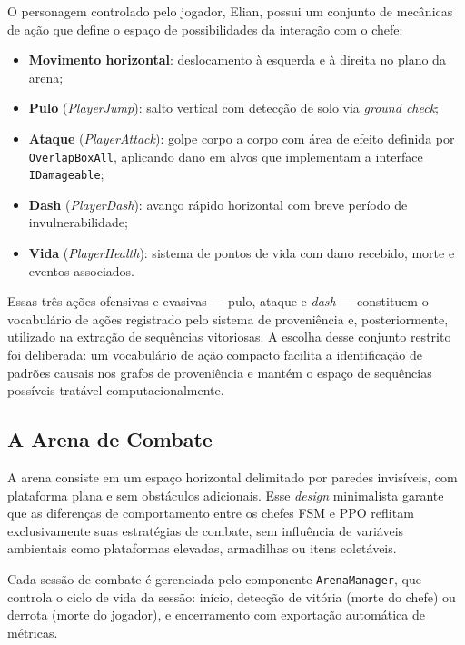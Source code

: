 O personagem controlado pelo jogador, Elian, possui um conjunto de mecânicas
de ação que define o espaço de possibilidades da interação com o chefe:

\begin{itemize}
    \item \textbf{Movimento horizontal}: deslocamento à esquerda e à direita
          no plano da arena;
    \item \textbf{Pulo} (\textit{PlayerJump}): salto vertical com detecção
          de solo via \textit{ground check};
    \item \textbf{Ataque} (\textit{PlayerAttack}): golpe corpo a corpo com
          área de efeito definida por \texttt{OverlapBoxAll}, aplicando dano
          em alvos que implementam a interface \texttt{IDamageable};
    \item \textbf{Dash} (\textit{PlayerDash}): avanço rápido horizontal com
          breve período de invulnerabilidade;
    \item \textbf{Vida} (\textit{PlayerHealth}): sistema de pontos de vida
          com dano recebido, morte e eventos associados.
\end{itemize}

Essas três ações ofensivas e evasivas --- pulo, ataque e \textit{dash} ---
constituem o vocabulário de ações registrado pelo sistema de proveniência e,
posteriormente, utilizado na extração de sequências vitoriosas. A escolha
desse conjunto restrito foi deliberada: um vocabulário de ação compacto
facilita a identificação de padrões causais nos grafos de proveniência e
mantém o espaço de sequências possíveis tratável computacionalmente.

\subsection{A Arena de Combate}
\label{subsec:arena}

A arena consiste em um espaço horizontal delimitado por paredes invisíveis,
com plataforma plana e sem obstáculos adicionais. Esse \textit{design}
minimalista garante que as diferenças de comportamento entre os chefes FSM e
PPO reflitam exclusivamente suas estratégias de combate, sem influência de
variáveis ambientais como plataformas elevadas, armadilhas ou itens coletáveis.

Cada sessão de combate é gerenciada pelo componente \texttt{ArenaManager}, que
controla o ciclo de vida da sessão: início, detecção de vitória (morte do
chefe) ou derrota (morte do jogador), e encerramento com exportação automática
de métricas.

